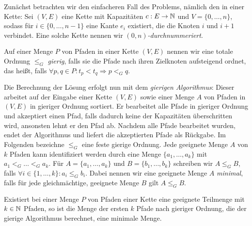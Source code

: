 Zunächst betrachten wir den einfacheren Fall des Problems, nämlich den in einer Kette:
Sei $(V,E)$ eine Kette mit Kapazitäten $c: E \to \mathbb N$ und $V=\{0,\dots,n\}$, sodass für $i \in \{0,\dots,n-1\}$
eine Kante $e_i$ existiert, die die Knoten $i$ und $i+1$ verbindet.
Eine solche Kette nennen wir  {\em $(0, n)$-durchnummeriert}.
\begin{definition}
    Auf einer Menge $P$ von Pfaden in einer Kette $(V,E)$ nennen wir eine totale Ordnung $\leq_G$ {\em gierig},
    falls sie die Pfade nach ihren Zielknoten aufsteigend ordnet, das heißt, falls
    $\forall p, q \in P \colon t_p < t_q \Rightarrow p <_G q$.
\end{definition}
Die Berechnung der Lösung erfolgt nun mit dem {\em gierigen Algorithmus}: Dieser arbeitet auf der Eingabe einer
Kette $(V,E)$ sowie einer Menge $A$ von Pfaden in $(V,E)$ in gieriger Ordnung sortiert. 
Er bearbeitet alle Pfade in gieriger Ordnung und akzeptiert einen Pfad, falls dadurch keine der Kapazitäten
überschritten wird, ansonsten lehnt er den Pfad ab.
Nachdem alle Pfade bearbeitet wurden, endet der Algorithmus und liefert die akzeptierten Pfade als Rückgabe.
Im Folgenden bezeichne $\leq_G$ eine feste gierige Ordnung.
Jede geeignete Menge $A$ von $k$ Pfaden kann identifiziert werden durch eine Menge $\{a_1, \dots, a_k\}$ mit
$a_1 <_G \dots <_G a_k$.
Für $A=\{a_1,\dots,a_k\}$ und $B=\{b_1,\dots,b_k\}$ schreiben wir $A \leq_G B$, falls $\forall i \in \{1,\dots,k\}\colon a_i \leq_G b_i$.
Dabei nennen wir eine geeignete Menge $A$ {\em minimal}, falls für jede gleichmächtige, geeignete Menge $B$
gilt $A \leq_G B$.
\begin{lemma}
    \label{greedyAlgorithm}
    Existiert bei einer Menge $P$ von Pfaden einer Kette eine geeignete Teilmenge mit $k \in \mathbb N$ Pfaden, so ist die
    Menge der ersten $k$ Pfade nach gieriger Ordnung, die der gierige Algorithmus berechnet, eine minimale Menge.
\end{lemma}
